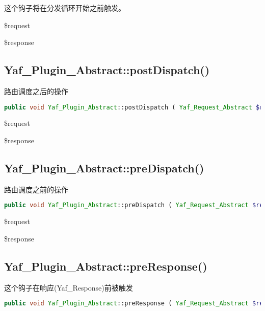 这个钩子将在分发循环开始之前触发。

\begin{compactitem}
\item \$request
\item \$response
\end{compactitem}



\subsection{Yaf\_Plugin\_Abstract::postDispatch()}

路由调度之后的操作


\begin{lstlisting}[language=PHP]
public void Yaf_Plugin_Abstract::postDispatch ( Yaf_Request_Abstract $request , Yaf_Response_Abstract $response )
\end{lstlisting}

\begin{compactitem}
\item \$request
\item \$response
\end{compactitem}

\subsection{Yaf\_Plugin\_Abstract::preDispatch()}

路由调度之前的操作


\begin{lstlisting}[language=PHP]
public void Yaf_Plugin_Abstract::preDispatch ( Yaf_Request_Abstract $request , Yaf_Response_Abstract $response )
\end{lstlisting}

\begin{compactitem}
\item \$request
\item \$response
\end{compactitem}


\subsection{Yaf\_Plugin\_Abstract::preResponse()}

这个钩子在响应(Yaf\_Response)前被触发



\begin{lstlisting}[language=PHP]
public void Yaf_Plugin_Abstract::preResponse ( Yaf_Request_Abstract $request , Yaf_Response_Abstract $response )
\end{lstlisting}

